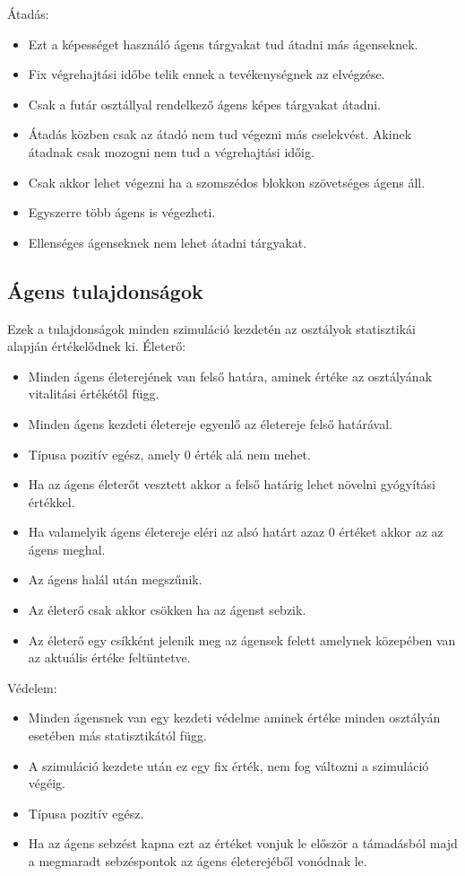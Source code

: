Átadás:

\begin{itemize}
  \item Ezt a képességet használó ágens tárgyakat tud átadni más ágenseknek.
  \item Fix végrehajtási időbe telik ennek a tevékenységnek az elvégzése.
  \item Csak a futár osztállyal rendelkező ágens képes tárgyakat átadni.
  \item Átadás közben csak az átadó nem tud végezni más cselekvést. Akinek átadnak csak mozogni nem tud a végrehajtási időig.
  \item Csak akkor lehet végezni ha a szomszédos blokkon szövetséges ágens áll.
  \item Egyszerre több ágens is végezheti.
  \item Ellenséges ágenseknek nem lehet átadni tárgyakat.
\end{itemize}

\subsection{Ágens tulajdonságok}

Ezek a tulajdonságok minden szimuláció kezdetén az osztályok statisztikái alapján értékelődnek ki.
\newline
Életerő:
\begin{itemize}
\item Minden ágens életerejének van felső határa, aminek értéke az osztályának vitalitási értékétől függ.
\item Minden ágens kezdeti életereje egyenlő az életereje felső határával. 
\item Típusa pozitív egész, amely 0 érték alá nem mehet.
\item Ha az ágens életerőt vesztett akkor a felső határig lehet növelni gyógyítási értékkel.
\item Ha valamelyik ágens életereje eléri az alsó határt azaz 0 értéket akkor az az ágens meghal.
\item Az ágens halál után megszűnik.
\item Az életerő csak akkor csökken ha az ágenst sebzik.
\item Az életerő egy csíkként jelenik meg az ágensek felett amelynek közepében van az aktuális értéke feltüntetve.
\end{itemize}

\noindent Védelem:

\begin{itemize}
\item Minden ágensnek van egy kezdeti védelme aminek értéke minden osztályán esetében más statisztikától függ.
\item A szimuláció kezdete után ez egy fix érték, nem fog változni a szimuláció végéig.
\item Típusa pozitív egész.
\item Ha az ágens sebzést kapna ezt az értéket vonjuk le először a támadásból majd a megmaradt sebzéspontok az ágens életerejéből vonódnak le.
\end{itemize}

